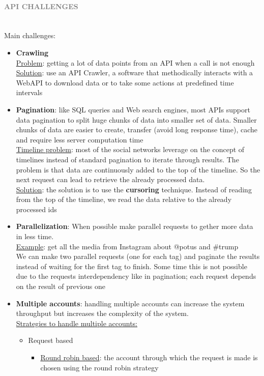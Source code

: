 \documentclass[10pt,a4paper]{article}
\newcommand{\myparagraph}[1]{\paragraph{\normalsize{\textcolor{gray}{\uppercase{\textbf{#1}}}} }\mbox{} \vspace{0.5em}\\}
\begin{document}
\pagebreak

\myparagraph{API Challenges}
Main challenges:
\begin{itemize}
	\item \textbf{Crawling} \\
	\uline{Problem}: getting a lot of data points from an API when a call is not enough \\
	\uline{Solution}: use an API Crawler, a software that methodically interacts with a WebAPI to download data or to take some actions at predefined time intervals
	\item \textbf{Pagination}: like SQL queries and Web search engines, most APIs support data pagination to split huge chunks of data into smaller set of data. Smaller chunks of data are easier to create, transfer (avoid long response time), cache and require less server computation time \\
	\uline{Timeline problem}: most of the social networks leverage on the concept of timelines instead of standard pagination to iterate through results. The problem is that data are continuously added to the top of the timeline. So the next request can lead to retrieve the already processed data.  \\
	\uline{Solution}: the solution is to use the \textbf{cursoring} technique. Instead of reading from the top of the timeline, we read the data relative to the already processed ids
	\item \textbf{Parallelization}: When possible make parallel requests to gether more data in less time. \\
	\uline{Example}: get all the media from Instagram about @potus and \#trump \\ 
	We can make two parallel requests (one for each tag) and paginate the results instead of waiting for the first tag to finish. Some time this is not possible due to the requests interdependency like in pagination; each request depends on the result of previous one
	\item \textbf{Multiple accounts}: handling multiple accounts can increase the system throughput but increases the complexity of the system.  \\
	\uline{Strategies to handle multiple accounts:}
	\begin{itemize}
		\item Request based
		\begin{itemize}
			\item \uline{Round robin based}: the account through which the request is made is chosen using the round robin strategy

\end{itemize}
\end{itemize}
\end{itemize}
\end{document}
